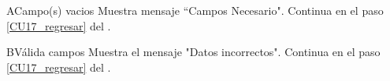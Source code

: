     \begin{UCtrayectoriaA}{A}{Campo(s) vacios}
    	\UCpaso Muestra mensaje “Campos Necesario".
    	\UCpaso Continua en el paso \ref{CU17_regresar} del .
    \end{UCtrayectoriaA}

	\begin{UCtrayectoriaA}{B}{Válida campos}
		\UCpaso Muestra el mensaje "Datos incorrectos".
   		\UCpaso Continua en el paso \ref{CU17_regresar} del .
	\end{UCtrayectoriaA}

	


